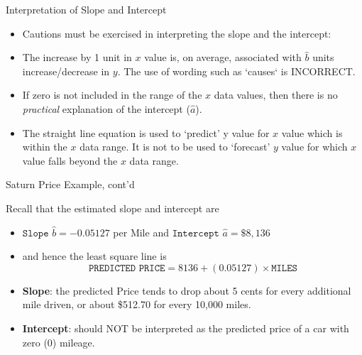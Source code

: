 \documentclass[14pt]{beamer}\usepackage[]{graphicx}\usepackage[]{color}
\begin{document}
\begin{frame}[fragile]{Interpretation of Slope and Intercept}

\begin{itemize}
\item<1-> Cautions must be exercised in interpreting the slope and the intercept:
\item<2-> The increase by 1 unit in $x$ value is, on average, associated with $\hat{b}$ units increase/decrease in $y$. The use of wording such as `causes`  is INCORRECT.
\item<3-> If zero is not included in the range of the $x$ data values, then there  is no \textit{practical} explanation of the intercept ($\hat{a}$).
\item<4-> The straight line equation is used to `predict' y value for $x$ value  which is within the $x$ data range. It is not to be used to `forecast' $y$  value for which $x$ value falls beyond the $x$ data range.
\end{itemize}
\end{frame}

\begin{frame}[fragile]{Saturn Price Example, cont'd}

Recall that the estimated slope and intercept are

\begin{itemize}
\item<1-> 
$\texttt{Slope } \hat{b} = -0.05127$ per Mile and $\texttt{Intercept } \hat{a} = \$8,136$

\item<2->   and hence the least square line is
{\footnotesize{
\begin{equation*}
\texttt{PREDICTED PRICE} = 8136 + (0.05127) \times \texttt{MILES}
\end{equation*}
}}

\vspace{-6mm}

\item<3-> \textbf{Slope}: the predicted Price tends to drop about 5 cents for every  additional mile driven, or about \$512.70 for every 10,000 miles.

\item<4-> \textbf{Intercept}: should NOT be interpreted as the predicted price of a car with zero (0) mileage.
\end{itemize}
\end{frame}
\end{document}

